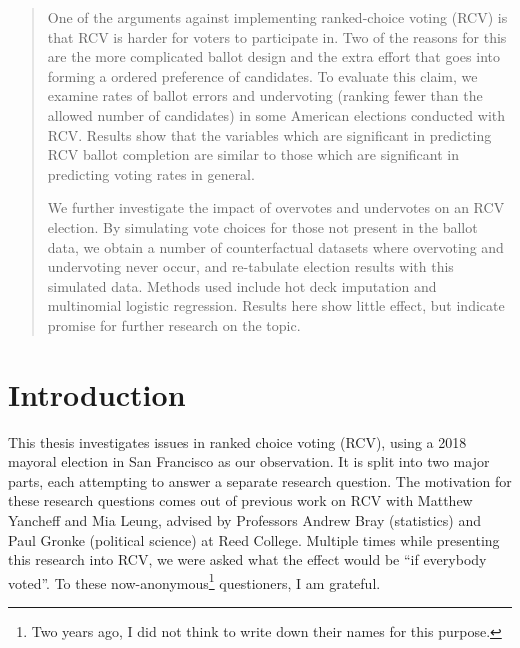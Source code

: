 \documentclass[12pt,twoside]{reedthesis}
\begin{document}
  \listoftables

  \listoffigures
  \begin{abstract}
    One of the arguments against implementing ranked-choice voting (RCV) is that RCV is harder for voters to participate in. Two of the reasons for this are the more complicated ballot design and the extra effort that goes into forming a ordered preference of candidates. To evaluate this claim, we examine rates of ballot errors and undervoting (ranking fewer than the allowed number of candidates) in some American elections conducted with RCV. Results show that the variables which are significant in predicting RCV ballot completion are similar to those which are significant in predicting voting rates in general.
    
    \par
    
    We further investigate the impact of overvotes and undervotes on an RCV election. By simulating vote choices for those not present in the ballot data, we obtain a number of counterfactual datasets where overvoting and undervoting never occur, and re-tabulate election results with this simulated data. Methods used include hot deck imputation and multinomial logistic regression. Results here show little effect, but indicate promise for further research on the topic.
  \end{abstract}

\mainmatter %
\pagestyle{fancyplain} %

\hypertarget{introduction}{%
\chapter*{Introduction}\label{introduction}}

This thesis investigates issues in ranked choice voting (RCV), using a 2018 mayoral election in San Francisco as our observation. It is split into two major parts, each attempting to answer a separate research question. The motivation for these research questions comes out of previous work on RCV with Matthew Yancheff and Mia Leung, advised by Professors Andrew Bray (statistics) and Paul Gronke (political science) at Reed College. Multiple times while presenting this research into RCV, we were asked what the effect would be ``if everybody voted''. To these now-anonymous\footnote{Two years ago, I did not think to write down their names for this purpose.} questioners, I am grateful.
\end{document}
